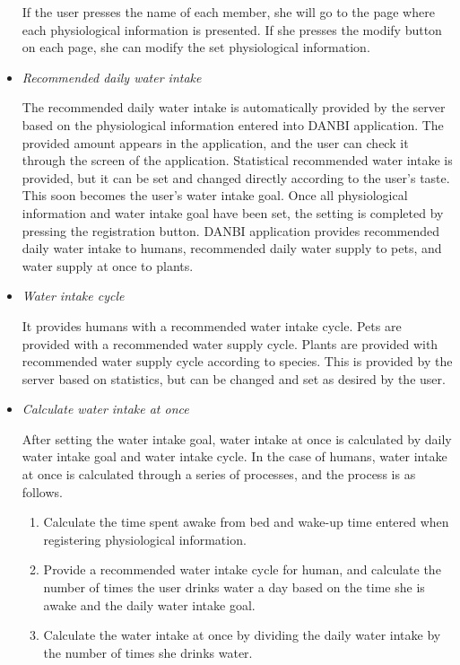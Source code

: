 \documentclass[conference]{IEEEtran}
\begin{document}
\begin{itemize}
If the user presses the name of each member, she will go to the page where each physiological information is presented. If she presses the modify button on each page, she can modify the set physiological information.
\item \textit{Recommended daily water intake}

The recommended daily water intake is automatically provided by the server based on the physiological information entered into DANBI application. The provided amount appears in the application, and the user can check it through the screen of the application. Statistical recommended water intake is provided, but it can be set and changed directly according to the user's taste. This soon becomes the user's water intake goal. Once all physiological information and water intake goal have been set, the setting is completed by pressing the registration button. DANBI application provides recommended daily water intake to humans, recommended daily water supply to pets, and water supply at once to plants. 
\item \textit{Water intake cycle}

It provides humans with a recommended water intake cycle. Pets are provided with a recommended water supply cycle. Plants are provided with recommended water supply cycle according to species. This is provided by the server based on statistics, but can be changed and set as desired by the user.
\item \textit{Calculate water intake at once}

After setting the water intake goal, water intake at once is calculated by daily water intake goal and water intake cycle. In the case of humans, water intake at once is calculated through a series of processes, and the process is as follows.
\begin{enumerate}
\setlength{\parindent}{2ex}
\item Calculate the time spent awake from bed and wake-up time entered when registering physiological information.

\item Provide a recommended water intake cycle for human, and calculate the number of times the user drinks water a day based on the time she is awake and the daily water intake goal.

\item Calculate the water intake at once by dividing the daily water intake by the number of times she drinks water.
\end{enumerate}


\end{itemize}
\end{document}
